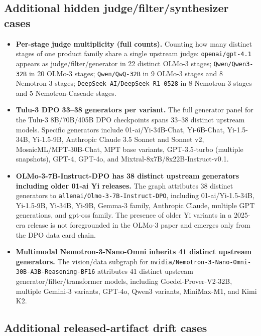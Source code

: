 \subsection{Additional hidden judge/filter/synthesizer cases}

\begin{itemize}
    \item \textbf{Per-stage judge multiplicity (full counts).}
    Counting how many distinct stages of one product family share a single upstream judge:
    \texttt{openai/gpt-4.1} appears as judge/filter/generator in 22 distinct OLMo-3 stages;
    \texttt{Qwen/Qwen3-32B} in 20 OLMo-3 stages;
    \texttt{Qwen/QwQ-32B} in 9 OLMo-3 stages and 8 Nemotron-3 stages;
    \texttt{DeepSeek-AI/DeepSeek-R1-0528} in 8 Nemotron-3 stages and 5 Nemotron-Cascade stages.

    \item \textbf{Tulu-3 DPO 33--38 generators per variant.}
    The full generator panel for the Tulu-3 8B/70B/405B DPO checkpoints spans 33--38 distinct upstream models. Specific generators include 01-ai/Yi-34B-Chat, Yi-6B-Chat, Yi-1.5-34B, Yi-1.5-9B, Anthropic Claude 3.5 Sonnet and Sonnet v2, MosaicML/MPT-30B-Chat, MPT base variants, GPT-3.5-turbo (multiple snapshots), GPT-4, GPT-4o, and Mixtral-8x7B/8x22B-Instruct-v0.1.

    \item \textbf{OLMo-3-7B-Instruct-DPO has 38 distinct upstream generators including older 01-ai Yi releases.}
    The graph attributes 38 distinct generators to \texttt{allenai/Olmo-3-7B-Instruct-DPO}, including 01-ai/Yi-1.5-34B, Yi-1.5-9B, Yi-34B, Yi-9B, Gemma-3 family, Anthropic Claude, multiple GPT generations, and gpt-oss family. The presence of older Yi variants in a 2025-era release is not foregrounded in the OLMo-3 paper and emerges only from the DPO data card chain.

    \item \textbf{Multimodal Nemotron-3-Nano-Omni inherits 41 distinct upstream generators.}
    The vision/data subgraph for \texttt{nvidia/Nemotron-3-Nano-Omni-30B-A3B-Reasoning-BF16} attributes 41 distinct upstream generator/filter/transformer models, including Goedel-Prover-V2-32B, multiple Gemini-3 variants, GPT-4o, Qwen3 variants, MiniMax-M1, and Kimi K2.
\end{itemize}

\subsection{Additional released-artifact drift cases}

